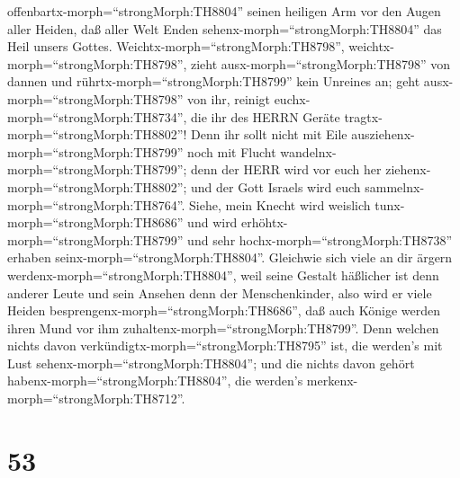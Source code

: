 offenbartx-morph=``strongMorph:TH8804'' seinen heiligen Arm vor den
Augen aller Heiden, daß aller Welt Enden
sehenx-morph=``strongMorph:TH8804'' das Heil unsers Gottes.
 Weichtx-morph=``strongMorph:TH8798'',
weichtx-morph=``strongMorph:TH8798'', zieht
ausx-morph=``strongMorph:TH8798'' von dannen und
rührtx-morph=``strongMorph:TH8799'' kein Unreines an; geht
ausx-morph=``strongMorph:TH8798'' von ihr, reinigt
euchx-morph=``strongMorph:TH8734'', die ihr des HERRN Geräte
tragtx-morph=``strongMorph:TH8802''!  Denn ihr sollt nicht
mit Eile ausziehenx-morph=``strongMorph:TH8799'' noch mit Flucht
wandelnx-morph=``strongMorph:TH8799''; denn der HERR wird vor euch her
ziehenx-morph=``strongMorph:TH8802''; und der Gott Israels wird euch
sammelnx-morph=``strongMorph:TH8764''.  Siehe, mein Knecht
wird weislich tunx-morph=``strongMorph:TH8686'' und wird
erhöhtx-morph=``strongMorph:TH8799'' und sehr
hochx-morph=``strongMorph:TH8738'' erhaben
seinx-morph=``strongMorph:TH8804''.  Gleichwie sich viele
an dir ärgern werdenx-morph=``strongMorph:TH8804'', weil seine Gestalt
häßlicher ist denn anderer Leute und sein Ansehen denn der
Menschenkinder,  also wird er viele Heiden
besprengenx-morph=``strongMorph:TH8686'', daß auch Könige werden ihren
Mund vor ihm zuhaltenx-morph=``strongMorph:TH8799''. Denn welchen nichts
davon verkündigtx-morph=``strongMorph:TH8795'' ist, die werden's mit
Lust sehenx-morph=``strongMorph:TH8804''; und die nichts davon gehört
habenx-morph=``strongMorph:TH8804'', die werden's
merkenx-morph=``strongMorph:TH8712''.

\hypertarget{section-52}{%
\section{53}\label{section-52}}

